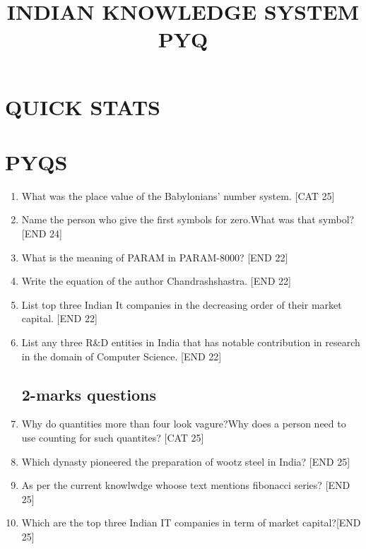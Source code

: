 \documentclass[12pt]{article}
\begin{document}
	\title{\LARGE{INDIAN KNOWLEDGE SYSTEM PYQ}}
	\date{\nodate}
	\maketitle
	\chapter{QUICK STATS}
	\newpage
	
	\chapter{\LARGE{PYQS}}

	\begin{enumerate}
		\section{1-marks questions}
			\item What was the place value of the Babylonians' number system.
			\hfill{[CAT 25]}
			
			\item Name the person who give the first symbols for zero.What was that symbol? \hfill{[END 24]}
			
			\item What is the meaning of PARAM in PARAM-8000? \hfill{[END 22]}
			
			\item Write the equation of the author Chandrashshastra. \hfill{[END 22]}
			
			\item List top three Indian It companies in the decreasing order of their market capital. \hfill{[END 22]}
			
			\item List any three R\&D entities in India that has notable contribution in research in the domain of Computer Science. \hfill{[END 22]}
			
			
			
			
			
			
		\section{2-marks questions}
			\item Why do quantities more than four look vagure?Why does a person need to use counting for such quantites? \hfill{[CAT 25]}
			\item Which dynasty pioneered the preparation of wootz steel in India? \hfill[END 25]
			\item As per the current knowlwdge whoose text mentions fibonacci series? \hfill{[END 25]}
			\item Which are the top three Indian IT companies in term of market capital?\hfill{[END 25]}
			

\end{enumerate}
\end{document}
